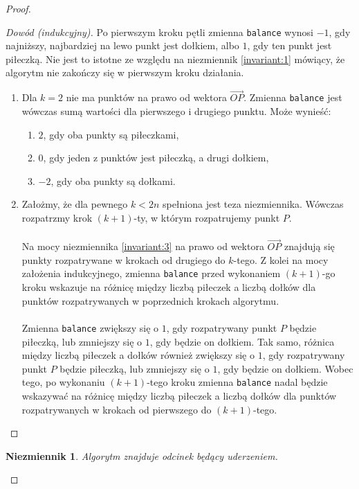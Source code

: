 \documentclass[10pt,a4paper]{article}
\newtheorem{invariant}{Niezmiennik}
\begin{document}
\begin{proof}
\begin{addmargin}[1.25em]{0em}
			\begin{proof}[Dowód (indukcyjny)]
				Po pierwszym kroku pętli zmienna \texttt{balance} wynosi $-1$, gdy najniższy, najbardziej na lewo punkt jest dołkiem, albo $1$, gdy ten punkt jest piłeczką. Nie jest to istotne ze względu na niezmiennik \ref{invariant:1} mówiący, że algorytm nie zakończy się w pierwszym kroku działania.
				\begin{enumerate}
					\item Dla $k = 2$ nie ma punktów na prawo od wektora $\overrightarrow{OP}$. Zmienna \texttt{balance} jest wówczas sumą wartości dla pierwszego i drugiego punktu. Może wynieść:
					\begin{enumerate}
						\item $2$, gdy oba punkty są piłeczkami,
						\item $0$, gdy jeden z punktów jest piłeczką, a drugi dołkiem,
						\item $-2$, gdy oba punkty są dołkami.
					\end{enumerate}
					\item Założmy, że dla pewnego $k < 2n$ spełniona jest teza niezmiennika. Wówczas rozpatrzmy krok $(k+1)$-ty, w którym rozpatrujemy punkt $P$. \\~\\
					Na mocy niezmiennika \ref{invariant:3} na prawo od wektora $\overrightarrow{OP}$ znajdują się punkty rozpatrywane w krokach od drugiego do $k$-tego. Z kolei na mocy założenia indukcyjnego, zmienna \texttt{balance} przed wykonaniem $(k+1)$-go kroku wskazuje na różnicę między liczbą piłeczek a liczbą dołków dla punktów rozpatrywanych w poprzednich krokach algorytmu. \\~\\
					Zmienna \texttt{balance} zwiększy się o $1$, gdy rozpatrywany punkt $P$ będzie piłeczką, lub zmniejszy się o $1$, gdy będzie on dołkiem. Tak samo, różnica między liczbą piłeczek a dołków również zwiększy się o $1$, gdy rozpatrywany punkt $P$ będzie piłeczką, lub zmniejszy się o $1$, gdy będzie on dołkiem. Wobec tego, po wykonaniu $(k+1)$-tego kroku zmienna \texttt{balance} nadal będzie wskazywać na różnicę między liczbą piłeczek a liczbą dołków dla punktów rozpatrywanych w krokach od pierwszego do $(k+1)$-tego. 
				\end{enumerate}
			\end{proof}
			
			\vspace{2.5em}
			
			\begin{invariant} \label{invariant:5}
				Algorytm znajduje odcinek będący uderzeniem.
			\end{invariant}
			

\end{addmargin}
\end{proof}
\end{document}
